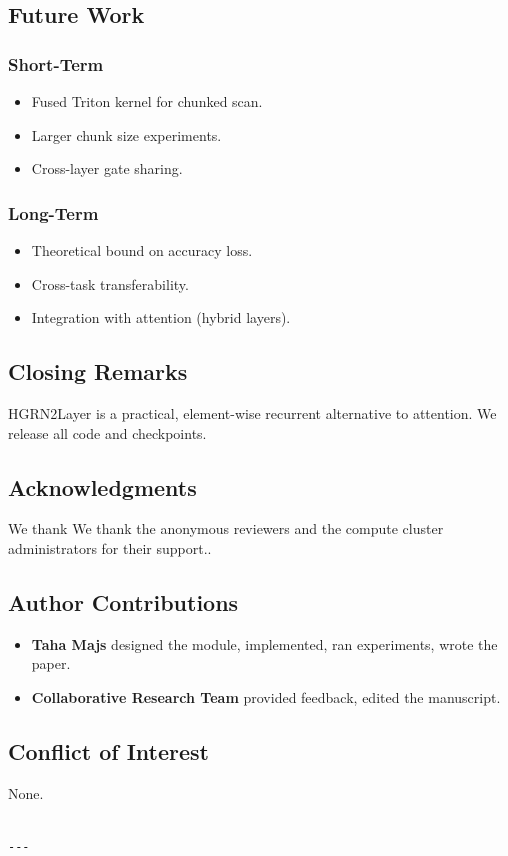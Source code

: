 \subsection{Future Work}

\subsubsection{Short-Term}
\begin{itemize}
\item Fused Triton kernel for chunked scan.
\item Larger chunk size experiments.
\item Cross-layer gate sharing.

\end{itemize}
\subsubsection{Long-Term}
\begin{itemize}
\item Theoretical bound on accuracy loss.
\item Cross-task transferability.
\item Integration with attention (hybrid layers).

\end{itemize}
\subsection{Closing Remarks}

HGRN2Layer is a practical, element-wise recurrent alternative to attention. 
We release all code and checkpoints.

\subsection{Acknowledgments}

We thank We thank the anonymous reviewers and the compute cluster administrators for their support..

\subsection{Author Contributions}

\begin{itemize}
\item \textbf{Taha Majs} designed the module, implemented, ran experiments, wrote
  the paper.
\item \textbf{Collaborative Research Team} provided feedback, edited the manuscript.

\end{itemize}
\subsection{Conflict of Interest}

None.
\begin{lstlisting}

---
\end{lstlisting}